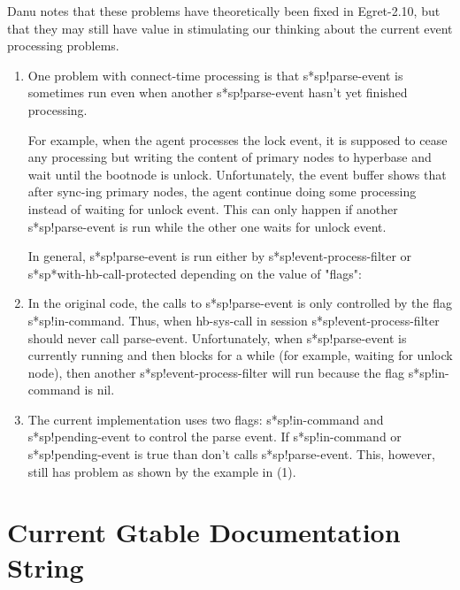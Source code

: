 Danu notes that these problems have theoretically been fixed in 
Egret-2.10, but that they may still have value in stimulating our
thinking about the current event processing problems. 

\begin{enumerate}
  
\item One problem with connect-time processing is that s*sp!parse-event is
  sometimes run even when another s*sp!parse-event hasn't yet finished
  processing.
  
  For example, when the agent processes the lock event, it is supposed to
  cease any processing but writing the content of primary nodes to
  hyperbase and wait until the bootnode is unlock.  Unfortunately, the
  event buffer shows that after sync-ing primary nodes, the agent continue
  doing some processing instead of waiting for unlock event.  This can only
  happen if another s*sp!parse-event is run while the other one waits for
  unlock event.
  
  In general, s*sp!parse-event is run either by s*sp!event-process-filter
  or s*sp*with-hb-call-protected depending on the value of "flags":
  
\item In the original code, the calls to s*sp!parse-event is only
  controlled by the flag s*sp!in-command.  Thus, when hb-sys-call in
  session s*sp!event-process-filter should never call parse-event.
  Unfortunately, when s*sp!parse-event is currently running and then blocks
  for a while (for example, waiting for unlock node), then another
  s*sp!event-process-filter will run because the flag s*sp!in-command is
  nil.
  
\item The current implementation uses two flags: s*sp!in-command and
  s*sp!pending-event to control the parse event.  If s*sp!in-command or
  s*sp!pending-event is true than don't calls s*sp!parse-event.  This,
  however, still has problem as shown by the example in (1).
\end{enumerate}
 
\newpage
\section{Current Gtable Documentation String}
\label{app:gtable-doc-string}

